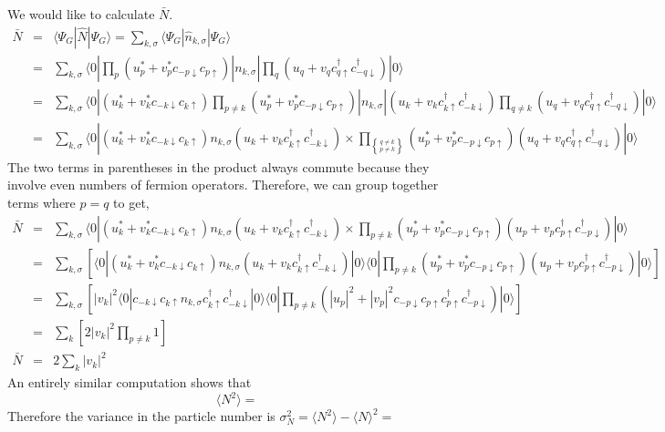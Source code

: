 \documentclass{article}
\begin{document}
We would like to calculate $\bar{N}$.\begin{eqnarray*}
\bar{N} & = & \langle\Psi_{G}|\hat{N}|\Psi_{G}\rangle=\sum_{k,\sigma}\langle\Psi_{G}|\hat{n}_{k,\sigma}|\Psi_{G}\rangle\\
 & = & \sum_{k,\sigma}\langle0|\prod_{p}(u_{p}^{*}+v_{p}^{*}c_{-p\downarrow}c_{p\uparrow})|n_{k,\sigma}|\prod_{q}(u_{q}+v_{q}c_{q\uparrow}^{\dagger}c_{-q\downarrow}^{\dagger})|0\rangle\\
 & = & \sum_{k,\sigma}\langle0|(u_{k}^{*}+v_{k}^{*}c_{-k\downarrow}c_{k\uparrow})\prod_{p\neq k}(u_{p}^{*}+v_{p}^{*}c_{-p\downarrow}c_{p\uparrow})|n_{k,\sigma}|(u_{k}+v_{k}c_{k\uparrow}^{\dagger}c_{-k\downarrow}^{\dagger})\prod_{q\neq k}(u_{q}+v_{q}c_{q\uparrow}^{\dagger}c_{-q\downarrow}^{\dagger})|0\rangle\\
 & = & \sum_{k,\sigma}\langle0|(u_{k}^{*}+v_{k}^{*}c_{-k\downarrow}c_{k\uparrow})n_{k,\sigma}(u_{k}+v_{k}c_{k\uparrow}^{\dagger}c_{-k\downarrow}^{\dagger})\times\prod_{{q\neq k \brace p\neq k}}(u_{p}^{*}+v_{p}^{*}c_{-p\downarrow}c_{p\uparrow})(u_{q}+v_{q}c_{q\uparrow}^{\dagger}c_{-q\downarrow}^{\dagger})|0\rangle\end{eqnarray*}
The two terms in parentheses in the product always commute because
they involve even numbers of fermion operators. Therefore, we can
group together terms where $p=q$ to get, \begin{eqnarray*}
\bar{N} & = & \sum_{k,\sigma}\langle0|(u_{k}^{*}+v_{k}^{*}c_{-k\downarrow}c_{k\uparrow})n_{k,\sigma}(u_{k}+v_{k}c_{k\uparrow}^{\dagger}c_{-k\downarrow}^{\dagger})\times\prod_{p\neq k}(u_{p}^{*}+v_{p}^{*}c_{-p\downarrow}c_{p\uparrow})(u_{p}+v_{p}c_{p\uparrow}^{\dagger}c_{-p\downarrow}^{\dagger})|0\rangle\\
 & = & \sum_{k,\sigma}\left[\langle0|(u_{k}^{*}+v_{k}^{*}c_{-k\downarrow}c_{k\uparrow})n_{k,\sigma}(u_{k}+v_{k}c_{k\uparrow}^{\dagger}c_{-k\downarrow}^{\dagger})|0\rangle\langle0|\prod_{p\neq k}(u_{p}^{*}+v_{p}^{*}c_{-p\downarrow}c_{p\uparrow})(u_{p}+v_{p}c_{p\uparrow}^{\dagger}c_{-p\downarrow}^{\dagger})|0\rangle\right]\\
 & = & \sum_{k,\sigma}\left[|v_{k}|^{2}\langle0|c_{-k\downarrow}c_{k\uparrow}n_{k,\sigma}c_{k\uparrow}^{\dagger}c_{-k\downarrow}^{\dagger}|0\rangle\langle0|\prod_{p\neq k}\left(|u_{p}|^{2}+|v_{p}|^{2}c_{-p\downarrow}c_{p\uparrow}c_{p\uparrow}^{\dagger}c_{-p\downarrow}^{\dagger}\right)|0\rangle\right]\\
 & = & \sum_{k}\left[2|v_{k}|^{2}\prod_{p\neq k}1\right]\\
\bar{N} & = & 2\sum_{k}|v_{k}|^{2}\end{eqnarray*}
An entirely similar computation shows that\[
\langle N^{2}\rangle=\]
 Therefore the variance in the particle number is $\sigma_{N}^{2}=\langle N^{2}\rangle-\langle N\rangle^{2}=$
\end{document}
